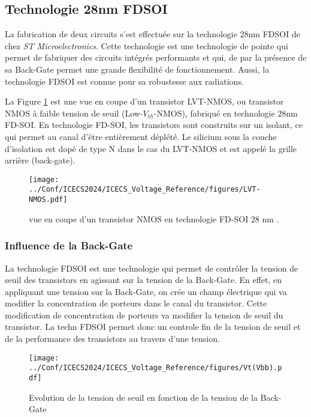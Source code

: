\subsection{Technologie 28nm FDSOI}

La fabrication de deux circuits s'est effectuée sur la technologie 28nm FDSOI de chez  \textit{ST Microelectronics}. Cette technologie est une technologie de pointe qui permet de fabriquer des circuits intégrés performants et qui, de par la présence de sa Back-Gate permet une grande flexibilité de fonctionnement. Aussi, la technologie FDSOI est connue pour sa robustesse aux radiations.



La Figure \ref{fig:coupeNMOS} est une vue en coupe d'un transistor LVT-NMOS, ou transistor NMOS à faible tension de seuil (Low-$V_{th}$-NMOS), fabriqué en technologie 28nm FD-SOI. En technologie FD-SOI, les transistors sont construits sur un isolant, ce qui permet au canal d’être entièrement déplété. Le silicium sous la couche d’isolation est dopé de type N dans le cas du LVT-NMOS et est appelé la grille arrière (back-gate).


\begin{figure}
    \centering
    \texttt{[image: ../Conf/ICECS2024/ICECS\_Voltage\_Reference/figures/LVT-NMOS.pdf]}
    \caption{vue en coupe d’un transistor NMOS en technologie FD-SOI 28 nm \cite{cathelin_fully_2017}.}
    \label{fig:coupeNMOS}
\end{figure}

\subsubsection{Influence de la Back-Gate} 
La technologie FDSOI est une technologie qui permet de contrôler la tension de seuil des transistors en agissant sur la tension de la Back-Gate.  En effet, en appliquant une tension sur la Back-Gate, on crée un champ électrique qui va modifier la concentration de porteurs dans le canal du transistor. Cette modification de concentration de porteurs va modifier la tension de seuil du transistor. La techn FDSOI permet donc un controle fin de la tension de seuil et de la performance des transistors au travers d'une tension.

\begin{figure}
    \centering
    \texttt{[image: ../Conf/ICECS2024/ICECS\_Voltage\_Reference/figures/Vt(Vbb).pdf]}
    \caption{Evolution de la tension de seuil en fonction de la tension de la Back-Gate}
    \label{fig:Vt(Vbb)}
\end{figure}

